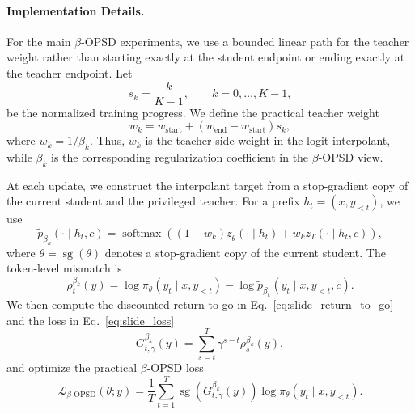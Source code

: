 \paragraph{Implementation Details.}
For the main $\beta$-OPSD experiments, we use a bounded linear path for the teacher
weight rather than starting exactly at the student endpoint or ending exactly at the teacher
endpoint. Let
\begin{equation}
    s_k = \frac{k}{K-1},
    \qquad
    k=0,\ldots,K-1,
\end{equation}
be the normalized training progress. We define the practical teacher weight
\begin{equation}
    w_k
    =
    w_{\mathrm{start}}
    +
    \left(
    w_{\mathrm{end}}-w_{\mathrm{start}}
    \right)s_k,
    \label{eq:exp_weight_schedule}
\end{equation}
where $w_k=1/\beta_k$. Thus, $w_k$ is the teacher-side weight in the logit interpolant,
while $\beta_k$ is the corresponding regularization coefficient in the $\beta$-OPSD view.

At each update, we construct the interpolant target from a stop-gradient copy of the
current student and the privileged teacher. For a prefix $h_t=(x,y_{<t})$, we use
\begin{equation}
    \tilde p_{\beta_k}(\cdot\mid h_t,c)
    =
    \operatorname{softmax}
    \left(
    (1-w_k)z_{\bar{\theta}}(\cdot\mid h_t)
    +
    w_k z_T(\cdot\mid h_t,c)
    \right),
    \label{eq:exp_interpolant_target}
\end{equation}
where $\bar{\theta}=\operatorname{sg}(\theta)$ denotes a stop-gradient copy of the
current student. The token-level mismatch is
\begin{equation}
    \rho_t^{\beta_k}(y)
    =
    \log \pi_\theta(y_t\mid x,y_{<t})
    -
    \log \tilde p_{\beta_k}(y_t\mid x,y_{<t},c).
    \label{eq:exp_token_mismatch}
\end{equation}
We then compute the discounted return-to-go in Eq.~\ref{eq:slide_return_to_go} and the \ours{} loss in Eq.~\ref{eq:slide_loss}
\begin{equation}
    G_{t,\gamma}^{\beta_k}(y)
    =
    \sum_{s=t}^{T}
    \gamma^{s-t}
    \rho_s^{\beta_k}(y),
    \label{eq:exp_return_to_go}
\end{equation}
and optimize the practical $\beta$-OPSD loss
\begin{equation}
    \mathcal{L}_{\beta\text{-OPSD}}(\theta;y)
    =
    \frac{1}{T}
    \sum_{t=1}^{T}
    \operatorname{sg}
    \left(
    G_{t,\gamma}^{\beta_k}(y)
    \right)
    \log \pi_\theta(y_t\mid x,y_{<t}).
    \label{eq:exp_beta_opsd_loss}
\end{equation}

